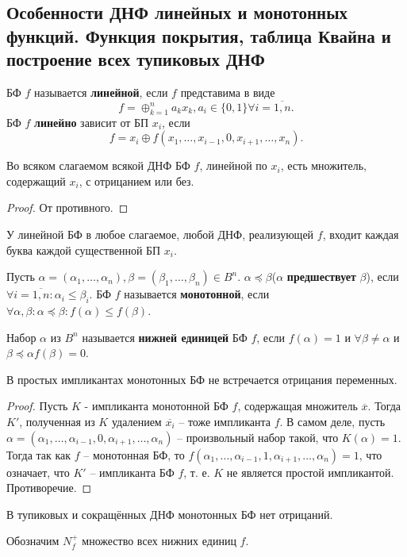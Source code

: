 \documentclass[11pt]{article}
\newcounter{th}\setcounter{th}{0}
\newcounter{cnsqnc}\setcounter{cnsqnc}{0}
\def\cnsqnc{\par\smallskip\refstepcounter{cnsqnc}\textbf{\arabic{cnsqnc}}}
\newtheorem*{Consequence}{Следствие \cnsqnc}
\newcounter{stnmt}\setcounter{stnmt}{0}
\def\st{\par\smallskip\refstepcounter{stnmt}\textbf{\arabic{stnmt}}}
\newtheorem*{Statement}{Утверждение \st}
\begin{document}
\subsection{Особенности ДНФ линейных и монотонных функций. Функция покрытия, таблица Квайна и построение всех тупиковых ДНФ}
\label{sec:org10b12e5}
БФ \(f\) называется \textbf{линейной}, если \(f\) представима в виде
\begin{equation*}
f = \oplus_{k = 1}^na_kx_k, a_i \in \{0, 1\} \forall i = \overline{1, n}.
\end{equation*}
БФ \(f\) \textbf{линейно} зависит от БП \(x_i\), если
\begin{equation*}
f = x_i \oplus f(x_1, \ldots, x_{i - 1}, 0, x_{i + 1}, \ldots, x_n).
\end{equation*}
\begin{Statement}
Во всяком слагаемом всякой ДНФ БФ $f$, линейной по $x_i$, есть множитель, содержащий $x_i$, с
отрицанием или без.
\end{Statement}
\begin{proof}
От противного.
\end{proof}
\begin{Consequence}
У линейной БФ в любое слагаемое, любой ДНФ, реализующей $f$, входит каждая буква каждой
существенной БП $x_i$.
\end{Consequence}
Пусть \(\alpha = (\alpha_1, \ldots, \alpha_n), \beta = (\beta_1, \ldots, \beta_n) \in B^n\).
\(\alpha \preceq \beta\)(\(\alpha\) \textbf{предшествует} \(\beta\)), если
\(\forall i = \overline{1, n}: \alpha_i \leq \beta_i\). БФ \(f\) называется \textbf{монотонной}, если
\(\forall \alpha, \beta: \alpha \preceq \beta: f(\alpha) \leq f(\beta)\).

Набор \(\alpha\) из \(B^n\) называется \textbf{нижней единицей} БФ \(f\), если \(f(\alpha) = 1\) и
\(\forall \beta \neq \alpha\) и \(\beta \preceq \alpha f(\beta) = 0\).
\begin{Statement}
В простых импликантах монотонных БФ не встречается отрицания переменных.
\end{Statement}
\begin{proof}
Пусть $K$ - импликанта монотонной БФ $f$, содержащая множитель $\overline{x}$. Тогда $K'$,
полученная из $K$ удалением $\overline{x_i}$ -- тоже импликанта $f$. В самом деле, пусть
$\alpha = (\alpha_1, \ldots, \alpha_{i - 1}, 0, \alpha_{i + 1}, \ldots, \alpha_n)$ -- произвольный
набор такой, что $K(\alpha) = 1$. Тогда так как $f$ -- монотонная БФ, то
$f(\alpha_1, \ldots, \alpha_{i - 1}, 1, \alpha_{i + 1}, \ldots, \alpha_n) = 1$, что означает, что
$K'$ -- импликанта БФ $f$, т. е. $K$ не является простой импликантой. Противоречие.
\end{proof}
\begin{Consequence}
В тупиковых и сокращённых ДНФ монотонных БФ нет отрицаний.
\end{Consequence}
Обозначим \(N_f^+\) множество всех нижних единиц \(f\).
\end{document}
